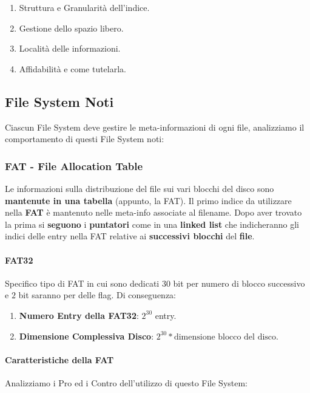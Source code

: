 \documentclass{article}
\begin{document}
\begin{enumerate}
    \item Struttura e Granularità dell'indice.
    \item Gestione dello spazio libero.
    \item Località delle informazioni.
    \item Affidabilità e come tutelarla.
\end{enumerate}

\newpage

\subsection{File System Noti}

Ciascun File System deve gestire le meta-informazioni di ogni file, analizziamo il comportamento di questi File System noti:

\subsubsection{FAT - File Allocation Table}

Le informazioni sulla distribuzione del file sui vari blocchi del disco sono \textbf{mantenute in una tabella} (appunto, la FAT). Il primo indice da utilizzare nella \textbf{FAT} è mantenuto nelle meta-info associate al filename. Dopo aver trovato la prima
si \textbf{seguono} i \textbf{puntatori} come in una \textbf{linked list} che indicheranno gli indici delle entry nella FAT relative ai \textbf{successivi blocchi} del \textbf{file}.

\paragraph{FAT32} Specifico tipo di FAT in cui sono dedicati $30$ bit per numero di blocco successivo e $2$ bit saranno per delle flag. Di conseguenza:

\begin{enumerate}
    \item \textbf{Numero Entry della FAT32}: $2^{30}$ entry.
    \item \textbf{Dimensione Complessiva Disco}: $2^{30} * \text{dimensione blocco del disco}$.
\end{enumerate}

\paragraph{Caratteristiche della FAT} Analizziamo i Pro ed i Contro dell'utilizzo di questo File System:
\end{document}
